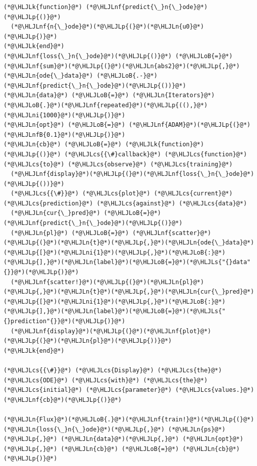 \documentclass[12pt,a4paper]{article}
\newcommand{\HLJLk}[1]{\textcolor[RGB]{148,91,176}{\textbf{#1}}}
\newcommand{\HLJLn}[1]{#1}
\newcommand{\HLJLnf}[1]{\textcolor[RGB]{66,102,213}{#1}}
\newcommand{\HLJLs}[1]{\textcolor[RGB]{201,61,57}{#1}}
\newcommand{\HLJLnfB}[1]{\textcolor[RGB]{59,151,46}{#1}}
\newcommand{\HLJLni}[1]{\textcolor[RGB]{59,151,46}{#1}}
\newcommand{\HLJLoB}[1]{\textcolor[RGB]{102,102,102}{\textbf{#1}}}
\newcommand{\HLJLp}[1]{#1}
\newcommand{\HLJLcs}[1]{\textcolor[RGB]{153,153,119}{\textit{#1}}}
\begin{document}
\begin{lstlisting}
(*@\HLJLk{function}@*) (*@\HLJLnf{predict{\_}n{\_}ode}@*)(*@\HLJLp{()}@*)
  (*@\HLJLnf{n{\_}ode}@*)(*@\HLJLp{(}@*)(*@\HLJLn{u0}@*)(*@\HLJLp{)}@*)
(*@\HLJLk{end}@*)
(*@\HLJLnf{loss{\_}n{\_}ode}@*)(*@\HLJLp{()}@*) (*@\HLJLoB{=}@*) (*@\HLJLnf{sum}@*)(*@\HLJLp{(}@*)(*@\HLJLn{abs2}@*)(*@\HLJLp{,}@*)(*@\HLJLn{ode{\_}data}@*) (*@\HLJLoB{.-}@*) (*@\HLJLnf{predict{\_}n{\_}ode}@*)(*@\HLJLp{())}@*)
(*@\HLJLn{data}@*) (*@\HLJLoB{=}@*) (*@\HLJLn{Iterators}@*)(*@\HLJLoB{.}@*)(*@\HLJLnf{repeated}@*)(*@\HLJLp{((),}@*) (*@\HLJLni{1000}@*)(*@\HLJLp{)}@*)
(*@\HLJLn{opt}@*) (*@\HLJLoB{=}@*) (*@\HLJLnf{ADAM}@*)(*@\HLJLp{(}@*)(*@\HLJLnfB{0.1}@*)(*@\HLJLp{)}@*)
(*@\HLJLn{cb}@*) (*@\HLJLoB{=}@*) (*@\HLJLk{function}@*) (*@\HLJLp{()}@*) (*@\HLJLcs{{\#}callback}@*) (*@\HLJLcs{function}@*) (*@\HLJLcs{to}@*) (*@\HLJLcs{observe}@*) (*@\HLJLcs{training}@*)
  (*@\HLJLnf{display}@*)(*@\HLJLp{(}@*)(*@\HLJLnf{loss{\_}n{\_}ode}@*)(*@\HLJLp{())}@*)
  (*@\HLJLcs{{\#}}@*) (*@\HLJLcs{plot}@*) (*@\HLJLcs{current}@*) (*@\HLJLcs{prediction}@*) (*@\HLJLcs{against}@*) (*@\HLJLcs{data}@*)
  (*@\HLJLn{cur{\_}pred}@*) (*@\HLJLoB{=}@*) (*@\HLJLnf{predict{\_}n{\_}ode}@*)(*@\HLJLp{()}@*)
  (*@\HLJLn{pl}@*) (*@\HLJLoB{=}@*) (*@\HLJLnf{scatter}@*)(*@\HLJLp{(}@*)(*@\HLJLn{t}@*)(*@\HLJLp{,}@*)(*@\HLJLn{ode{\_}data}@*)(*@\HLJLp{[}@*)(*@\HLJLni{1}@*)(*@\HLJLp{,}@*)(*@\HLJLoB{:}@*)(*@\HLJLp{],}@*)(*@\HLJLn{label}@*)(*@\HLJLoB{=}@*)(*@\HLJLs{"{}data"{}}@*)(*@\HLJLp{)}@*)
  (*@\HLJLnf{scatter!}@*)(*@\HLJLp{(}@*)(*@\HLJLn{pl}@*)(*@\HLJLp{,}@*)(*@\HLJLn{t}@*)(*@\HLJLp{,}@*)(*@\HLJLn{cur{\_}pred}@*)(*@\HLJLp{[}@*)(*@\HLJLni{1}@*)(*@\HLJLp{,}@*)(*@\HLJLoB{:}@*)(*@\HLJLp{],}@*)(*@\HLJLn{label}@*)(*@\HLJLoB{=}@*)(*@\HLJLs{"{}prediction"{}}@*)(*@\HLJLp{)}@*)
  (*@\HLJLnf{display}@*)(*@\HLJLp{(}@*)(*@\HLJLnf{plot}@*)(*@\HLJLp{(}@*)(*@\HLJLn{pl}@*)(*@\HLJLp{))}@*)
(*@\HLJLk{end}@*)

(*@\HLJLcs{{\#}}@*) (*@\HLJLcs{Display}@*) (*@\HLJLcs{the}@*) (*@\HLJLcs{ODE}@*) (*@\HLJLcs{with}@*) (*@\HLJLcs{the}@*) (*@\HLJLcs{initial}@*) (*@\HLJLcs{parameter}@*) (*@\HLJLcs{values.}@*)
(*@\HLJLnf{cb}@*)(*@\HLJLp{()}@*)

(*@\HLJLn{Flux}@*)(*@\HLJLoB{.}@*)(*@\HLJLnf{train!}@*)(*@\HLJLp{(}@*)(*@\HLJLn{loss{\_}n{\_}ode}@*)(*@\HLJLp{,}@*) (*@\HLJLn{ps}@*)(*@\HLJLp{,}@*) (*@\HLJLn{data}@*)(*@\HLJLp{,}@*) (*@\HLJLn{opt}@*)(*@\HLJLp{,}@*) (*@\HLJLn{cb}@*) (*@\HLJLoB{=}@*) (*@\HLJLn{cb}@*)(*@\HLJLp{)}@*)
\end{lstlisting}
\end{document}
